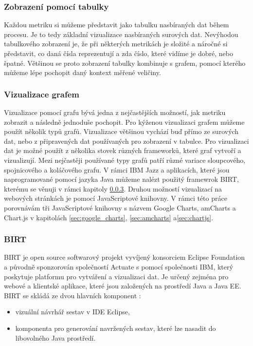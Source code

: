 \documentclass[czech,master,public,dept460,male,cpdeclaration,oneside]{diploma}
\begin{document}
\subsubsection{Zobrazení pomocí tabulky}
Každou metriku si můžeme představit jako tabulku nasbíraných dat během procesu. Je to tedy základní vizualizace nasbíraných surových dat. Nevýhodou tabulkového zobrazení je, že při některých metrikách je složité a náročné si představit, co daná čísla reprezentují a zda číslo, které vidíme je dobré, nebo špatné. Většinou se proto zobrazení tabulky kombinuje s grafem, pomocí kterého můžeme lépe pochopit daný kontext měřené veličiny.

\subsubsection{Vizualizace grafem}
Vizualizace pomocí grafu bývá jedna z nejčastějších možností, jak metriku zobrazit a následně jednoduše pochopit. Pro kýženou vizualizaci grafem můžeme použít několik typů grafů. Vizualizace většinou vychází buď přímo ze surových dat, nebo z připravených dat používaných pro zobrazení v tabulce. Pro vizualizaci dat je možné použít z několika stovek různých frameworků, které graf vytvoří a vizualizují. Mezi nejčastěji používané typy grafů patří různé variace sloupcového, spojnicového a koláčového grafu. V rámci IBM Jazz a aplikacích, které jsou naprogramované pomocí jazyka Java můžeme nalézt použitý framewrok BIRT, kterému se věnuji v rámci kapitoly \ref{sec:birt}. Druhou možností vizualizací na webových stránkách je pomocí JavaScriptové knihovny. V rámci této práce porovnávám tři JavaScriptové knihovny s názvem Google Charts, amCharts a Chart.js v kapitolách \ref{sec:google_charts}, \ref{sec:amcharts} a\ref{sec:chartjs}.

\subsubsection{BIRT}
\label{sec:birt}
BIRT je open source softwarový projekt vyvíjený konsorciem Eclipse Foundation a původně sponzorován společností Actuate s pomocí společnosti IBM, který poskytuje platformu pro vytváření a vizualizaci dat. Je určený zejména pro webové a klientské aplikace, které jsou založených na prostředí Java a Java EE. BIRT se skládá ze dvou hlavních komponent \cite{ref:birt_about}:

\begin{itemize}
\item vizuální návrhář sestav v IDE Eclipse,
\item komponenta pro generování navržených sestav, které lze nasadit do libovolného Java prostředí.
\end{itemize}
\end{document}
